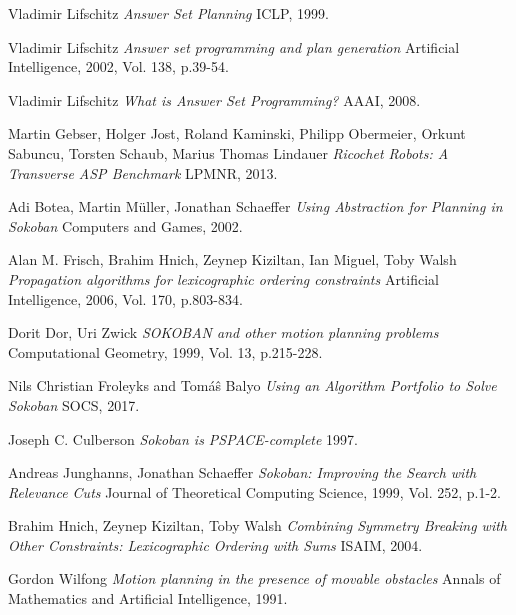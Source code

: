 \documentclass{article}
\begin{document}
\begin{thebibliography}{}
Vladimir Lifschitz
\textit{Answer Set Planning}
ICLP, 1999.

Vladimir Lifschitz
\textit{Answer set programming and plan generation}
Artificial Intelligence, 2002, Vol. 138, p.39-54.

Vladimir Lifschitz
\textit{What is Answer Set Programming?}
AAAI, 2008.

Martin Gebser, Holger Jost, Roland Kaminski, Philipp Obermeier, Orkunt Sabuncu, Torsten Schaub, Marius Thomas Lindauer
\textit{Ricochet Robots: A Transverse ASP Benchmark}
LPMNR, 2013.

Adi Botea, Martin Müller, Jonathan Schaeffer
\textit{Using Abstraction for Planning in Sokoban}
Computers and Games, 2002.

Alan M. Frisch, Brahim Hnich, Zeynep Kiziltan, Ian Miguel, Toby Walsh
\textit{Propagation algorithms for lexicographic ordering constraints}
Artificial Intelligence, 2006, Vol. 170, p.803-834.

Dorit Dor, Uri Zwick
\textit{SOKOBAN and other motion planning problems}
Computational Geometry, 1999, Vol. 13, p.215-228.

Nils Christian Froleyks and Tom{\'a}{\^s} Balyo
\textit{Using an Algorithm Portfolio to Solve Sokoban}
SOCS, 2017.

Joseph C. Culberson
\textit{Sokoban is PSPACE-complete}
1997.

Andreas Junghanns, Jonathan Schaeffer
\textit{Sokoban: Improving the Search with Relevance Cuts}
Journal of Theoretical Computing Science, 1999, Vol. 252, p.1-2.

Brahim Hnich, Zeynep Kiziltan, Toby Walsh
\textit{Combining Symmetry Breaking with Other Constraints: Lexicographic Ordering with Sums}
ISAIM, 2004.

Gordon Wilfong
\textit{Motion planning in the presence of movable obstacles}
Annals of Mathematics and Artificial Intelligence, 1991.
\end{thebibliography}
\end{document}
